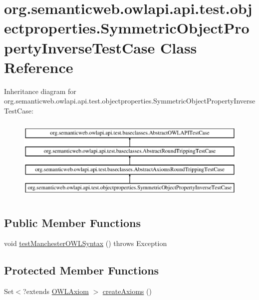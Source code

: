 \hypertarget{classorg_1_1semanticweb_1_1owlapi_1_1api_1_1test_1_1objectproperties_1_1_symmetric_object_property_inverse_test_case}{\section{org.\-semanticweb.\-owlapi.\-api.\-test.\-objectproperties.\-Symmetric\-Object\-Property\-Inverse\-Test\-Case Class Reference}
\label{classorg_1_1semanticweb_1_1owlapi_1_1api_1_1test_1_1objectproperties_1_1_symmetric_object_property_inverse_test_case}
}
Inheritance diagram for org.\-semanticweb.\-owlapi.\-api.\-test.\-objectproperties.\-Symmetric\-Object\-Property\-Inverse\-Test\-Case\-:\begin{figure}[H]
\begin{center}
\leavevmode
\includegraphics[height=4.000000cm]{classorg_1_1semanticweb_1_1owlapi_1_1api_1_1test_1_1objectproperties_1_1_symmetric_object_property_inverse_test_case}
\end{center}
\end{figure}
\subsection*{Public Member Functions}
\begin{DoxyCompactItemize}
\item 
void \hyperlink{classorg_1_1semanticweb_1_1owlapi_1_1api_1_1test_1_1objectproperties_1_1_symmetric_object_property_inverse_test_case_a7ae8c1449d687ec7e7adaafc3a869386}{test\-Manchester\-O\-W\-L\-Syntax} ()  throws Exception 
\end{DoxyCompactItemize}
\subsection*{Protected Member Functions}
\begin{DoxyCompactItemize}
\item 
Set$<$?extends \hyperlink{interfaceorg_1_1semanticweb_1_1owlapi_1_1model_1_1_o_w_l_axiom}{O\-W\-L\-Axiom} $>$ \hyperlink{classorg_1_1semanticweb_1_1owlapi_1_1api_1_1test_1_1objectproperties_1_1_symmetric_object_property_inverse_test_case_aac79df622683e78fe74f69ad36ff2d5a}{create\-Axioms} ()
\end{DoxyCompactItemize}


